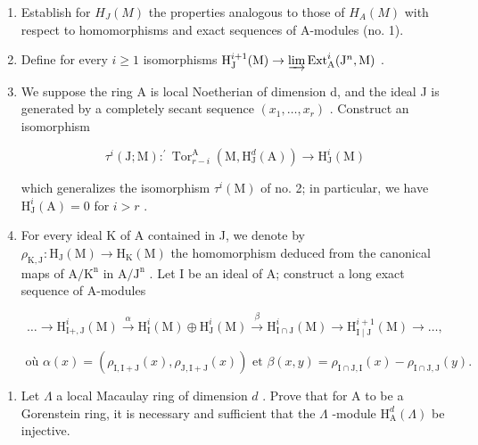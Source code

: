 \begin{enumerate}
\def\labelenumi{\alph{enumi})}
\item
  Establish for \(H_{J}(M)\) the properties analogous to those of \(H_{A}(M)\) with respect to homomorphisms and exact sequences of A-modules (no. 1).
\item
  Define for every \(i \geqslant 1\) isomorphisms \(\mathrm{H}_{\mathrm{J}}^{i+1}(\mathrm{M}) \to \varinjlim \operatorname{Ext}_{\mathrm{A}}^{i}(\mathrm{J}^{n}, \mathrm{M})\) .
\item
  We suppose the ring A is local Noetherian of dimension d, and the ideal J is generated by a completely secant sequence \((x_{1},\ldots,x_{r})\) . Construct an isomorphism

\[
\tau^ {i} (\mathrm{J}; \mathrm{M}): ^ {\prime} \operatorname{Tor} _ {r - i} ^ {\mathrm{A}} (\mathrm{M}, \mathrm{H} _ {\mathrm{J}} ^ {d} (\mathrm{A})) \longrightarrow \mathrm{H} _ {\mathrm{J}} ^ {i} (\mathrm{M})
\]

which generalizes the isomorphism \(\tau^{i}(\mathrm{M})\) of no. 2; in particular, we have \(\mathrm{H}_{\mathrm{J}}^{i}(\mathrm{A}) = 0\) for \(i > r\) .

\item
  For every ideal K of A contained in J, we denote by \(\rho_{\mathrm{K},\mathrm{J}}:\mathrm{H}_{\mathrm{J}}(\mathrm{M})\to \mathrm{H}_{\mathrm{K}}(\mathrm{M})\) the homomorphism deduced from the canonical maps of \(\mathrm{A / K^n}\) in \(\mathrm{A / J^n}\) . Let I be an ideal of A; construct a long exact sequence of A-modules

\[
\dots \longrightarrow \mathrm{H} _ {\mathrm{I} +, \mathrm{J}} ^ {i} (\mathrm{M}) \stackrel {\alpha} {\longrightarrow} \mathrm{H} _ {\mathrm{I}} ^ {i} (\mathrm{M}) \oplus \mathrm{H} _ {\mathrm{J}} ^ {i} (\mathrm{M}) \stackrel {\beta} {\longrightarrow} \mathrm{H} _ {\mathrm{I} \cap \mathrm{J}} ^ {i} (\mathrm{M}) \longrightarrow \mathrm{H} _ {\mathrm{I} \mid \mathrm{J}} ^ {i + 1} (\mathrm{M}) \longrightarrow \dots ,
\]

\[
\text {   où   } \alpha (x) = (\rho_ {\mathrm{I,I+J}} (x), \rho_ {\mathrm{J,I+J}} (x)) \text {   et   } \beta (x, y) = \rho_ {\mathrm{I} \cap \mathrm{J}, \mathrm{I}} (x) - \rho_ {\mathrm{I} \cap \mathrm{J}, \mathrm{J}} (y).
\]

\end{enumerate}

\begin{enumerate}
\def\labelenumi{\arabic{enumi})}
\setcounter{enumi}{1}
\tightlist
\item
  Let \(\Lambda\) a local Macaulay ring of dimension \(d\) . Prove that for A to be a Gorenstein ring, it is necessary and sufficient that the \(\Lambda\) -module \(\mathrm{H}_{\mathrm{A}}^{d}(\Lambda)\) be injective.
\end{enumerate}

